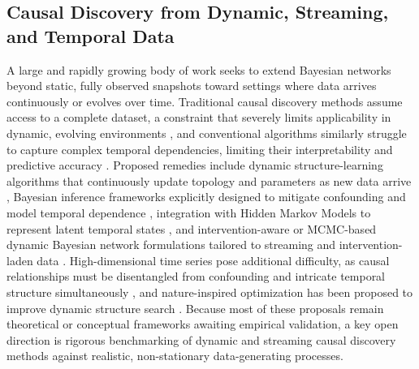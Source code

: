 \subsection{Causal Discovery from Dynamic, Streaming, and Temporal Data}
A large and rapidly growing body of work seeks to extend Bayesian networks beyond static, fully observed snapshots toward settings where data arrives continuously or evolves over time. Traditional causal discovery methods assume access to a complete dataset, a constraint that severely limits applicability in dynamic, evolving environments \cite{zhang2026dynamic}, and conventional algorithms similarly struggle to capture complex temporal dependencies, limiting their interpretability and predictive accuracy \cite{zhang2026dynamicc}. Proposed remedies include dynamic structure-learning algorithms that continuously update topology and parameters as new data arrive \cite{zhang2026causal,zhang2026causalb}, Bayesian inference frameworks explicitly designed to mitigate confounding and model temporal dependence \cite{zhang2026causalc}, integration with Hidden Markov Models to represent latent temporal states \cite{zhang2026causalf,zhang2026causale}, and intervention-aware or MCMC-based dynamic Bayesian network formulations tailored to streaming and intervention-laden data \cite{zhang2026dynamicb,zhang2026causall,zhang2026causalr,zhang2026causals,zhang2026causali}. High-dimensional time series pose additional difficulty, as causal relationships must be disentangled from confounding and intricate temporal structure simultaneously \cite{zhang2026causalk}, and nature-inspired optimization has been proposed to improve dynamic structure search \cite{meng2024dynamic}. Because most of these proposals remain theoretical or conceptual frameworks awaiting empirical validation, a key open direction is rigorous benchmarking of dynamic and streaming causal discovery methods against realistic, non-stationary data-generating processes.

